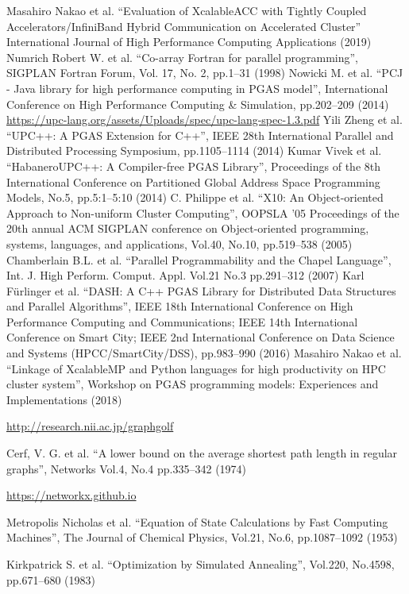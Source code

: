 \begin{thebibliography}{99.}
%
 Masahiro Nakao et al.
  ``Evaluation of XcalableACC with Tightly Coupled Accelerators/InfiniBand Hybrid Communication on Accelerated Cluster''
  International Journal of High Performance Computing Applications (2019)
%
 Numrich Robert W. et al.
``Co-array Fortran for parallel programming'',
SIGPLAN Fortran Forum, Vol. 17, No. 2, pp.1--31 (1998)
%
 Nowicki M. et al.
  ``PCJ - Java library for high performance computing in PGAS model'',
   International Conference on High Performance Computing \& Simulation, pp.202--209 (2014)
%
 \url{https://upc-lang.org/assets/Uploads/spec/upc-lang-spec-1.3.pdf}
%
 Yili Zheng et al.
  ``UPC++: A PGAS Extension for C++'',  IEEE 28th International Parallel and Distributed Processing Symposium, pp.1105--1114 (2014)
%
 Kumar Vivek et al.
``HabaneroUPC++: A Compiler-free PGAS Library'', 
  Proceedings of the 8th International Conference on Partitioned Global Address Space Programming Models,
  No.5, pp.5:1--5:10 (2014)
%
 C. Philippe et al.
``X10: An Object-oriented Approach to Non-uniform Cluster Computing'',
OOPSLA '05 Proceedings of the 20th annual ACM SIGPLAN conference on Object-oriented programming, systems, languages, and applications, Vol.40, No.10, pp.519--538 (2005)
%
 Chamberlain B.L. et al.
``Parallel Programmability and the Chapel Language'',
Int. J. High Perform. Comput. Appl. Vol.21 No.3 pp.291--312 (2007)
%
 Karl F{\"{u}}rlinger et al.
``DASH: A C++ PGAS Library for Distributed Data Structures and Parallel Algorithms'',
  IEEE 18th International Conference on High Performance Computing and Communications; IEEE 14th International Conference on Smart City; IEEE 2nd International Conference on Data Science and Systems (HPCC/SmartCity/DSS), pp.983--990 (2016)
%
 Masahiro Nakao et al.
``Linkage of XcalableMP and Python languages for high productivity on HPC cluster system'',
  Workshop on PGAS programming models: Experiences and Implementations (2018)

 \url{http://research.nii.ac.jp/graphgolf}

 Cerf, V. G. et al.
``A lower bound on the average shortest path length in regular graphs'',
Networks Vol.4, No.4 pp.335--342 (1974)

 \url{https://networkx.github.io}

 Metropolis Nicholas et al.
``Equation of State Calculations by Fast Computing Machines'',
The Journal of Chemical Physics, Vol.21, No.6, pp.1087--1092 (1953)

 Kirkpatrick S. et	al.
``Optimization by Simulated Annealing'', Vol.220, No.4598, pp.671--680 (1983)

\end{thebibliography}
